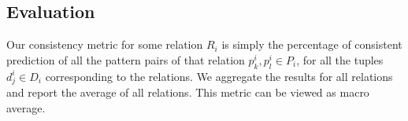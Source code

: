 \subsection{Evaluation}
\label{sec:eval}


Our consistency metric for some relation $R_i$ is simply the percentage of consistent prediction of all the pattern pairs of that relation $p_k^i,p_l^i \in P_i$, for all the tuples $d_j^i \in D_i$ corresponding to the relations.
We aggregate the results for all relations and report the average of all relations. This metric can be viewed as macro average.

